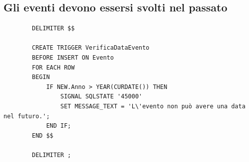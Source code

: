 \documentclass{article}
\begin{document}
    \subsection{Gli eventi devono essersi svolti nel passato}

    \begin{verbatim}
        DELIMITER $$

        CREATE TRIGGER VerificaDataEvento
        BEFORE INSERT ON Evento
        FOR EACH ROW
        BEGIN
            IF NEW.Anno > YEAR(CURDATE()) THEN
                SIGNAL SQLSTATE '45000'
                SET MESSAGE_TEXT = 'L\'evento non può avere una data nel futuro.';
            END IF;
        END $$

        DELIMITER ;
    \end{verbatim}
\end{document}

